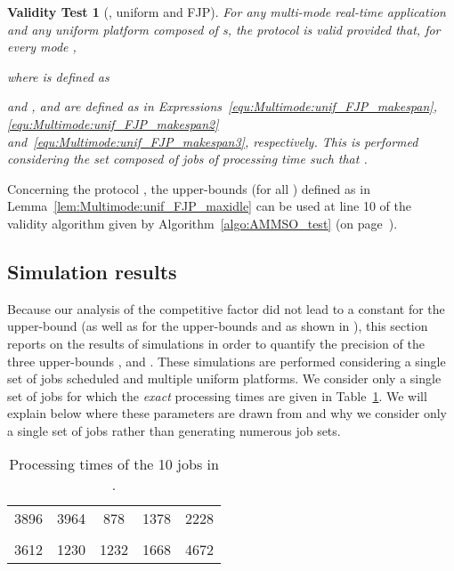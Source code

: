 \documentclass{article}
\newtheorem{validity test}{Validity Test}
\begin{document}
\begin{validity test}[, uniform and FJP]
\label{validitytest:Multimode:unif_FJP_SMMSO}
For any multi-mode real-time application  and any uniform platform  composed of  s, the protocol  is valid provided that, for every mode ,

where  is defined as 

\noindent and ,  and  are defined as in Expressions~\ref{equ:Multimode:unif_FJP_makespan}, \ref{equ:Multimode:unif_FJP_makespan2} and~\ref{equ:Multimode:unif_FJP_makespan3}, respectively. This is performed considering the set  composed of  jobs of processing time  such that  . 
\end{validity test}

Concerning the protocol , the upper-bounds  (for all ) defined as in Lemma~\ref{lem:Multimode:unif_FJP_maxidle} can be used at line 10 of the validity algorithm given by Algorithm~\ref{algo:AMMSO_test} (on page~\pageref{algo:AMMSO_test}).

\subsection{Simulation results}
\label{sec:Multimode:simulations}

Because our analysis of the competitive factor did not lead to a constant  for the upper-bound  (as well as for the upper-bounds  and  as shown in \cite{Nelis:10}), this section reports on the results of simulations in order to quantify the precision of the three upper-bounds ,  and . These simulations are performed considering a single set  of jobs scheduled and multiple uniform platforms. We consider only a single set  of jobs for which the \emph{exact} processing times are given in Table~\ref{tab:Multimode:simulations_jobs_processing_time}. We will explain below where these parameters are drawn from and why we consider only a single set of jobs rather than generating numerous job sets. \\ 

\begin{table}[h!]
\centering
\begin{tabular}{| c | c | c | c | c |}
\hline
 &  &  &  &  \\
\hline
3896 & 3964 & 878 & 1378 & 2228 \\
\hline
 &  &  &  &  \\
\hline
3612 & 1230 & 1232 & 1668 & 4672 \\
\hline
\end{tabular}
\caption{Processing times of the 10 jobs in .}
\label{tab:Multimode:simulations_jobs_processing_time}
\end{table}
\end{document}
